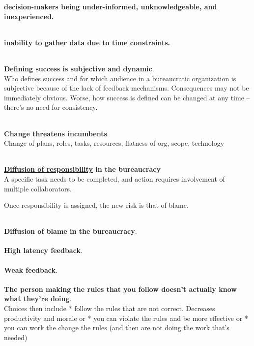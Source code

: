 \textbf{decision-makers being under-informed, unknowledgeable, and inexperienced.}

\ \\

\textbf{inability to gather data due to time constraints.}

\ \\

\textbf{Defining success is subjective and dynamic}. \\
Who defines success and for which audience in a bureaucratic organization is subjective because of the lack of feedback mechanisms. Consequences may not be immediately obvious. Worse, how success is defined can be changed at any time -- there's no need for consistency. 

\ \\

\textbf{Change threatens incumbents}. \\
Change of plans, roles, tasks, resources, flatness of org, scope, technology 

\ \\

\textbf{\href{https://en.wikipedia.org/wiki/Diffusion_of_responsibility}{Diffusion of responsibility} in the bureaucracy} \\
A specific task needs to be completed, and action requires involvement of multiple collaborators. 

Once responsibility is assigned, the new risk is that of blame.

\ \\

\textbf{Diffusion of blame in the bureaucracy}. \\

\ \\

\textbf{High latency feedback}. \\

\ \\

\textbf{Weak feedback}. \\

\ \\

\textbf{The person making the rules that you follow doesn't actually know what they're doing}. \\

Choices then include
* follow the rules that are not correct. Decreases productivity and morale
or 
* you can violate the rules and be more effective 
or 
* you can work the change the rules (and then are not doing the work that's needed)


